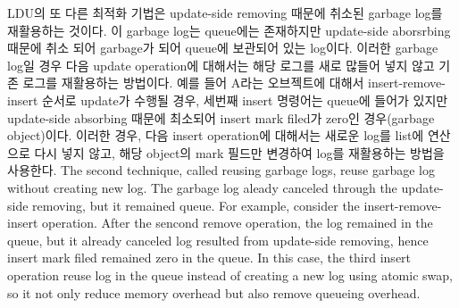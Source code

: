 
\ifkor
LDU의 또 다른 최적화 기법은 update-side removing 때문에 취소된 garbage log를 재활용하는 것이다.
이 garbage log는 queue에는 존재하지만 update-side aborsrbing 때문에 취소 되어 garbage가 되어 queue에
보관되어 있는 log이다. 
이러한 garbage log일 경우 다음 update operation에 대해서는 해당 로그를 새로 많들어 넣지 않고 기존 로그를 재활용하는
방법이다.
예를 들어 A라는 오브젝트에 대해서 insert-remove-insert 순서로 update가 수행될 경우, 세번째 insert 명령어는
queue에 들어가 있지만 update-side absorbing 때문에 최소되어 insert mark filed가 zero인
경우(garbage object)이다.
이러한 경우, 다음 insert operation에 대해서는 새로운 log를 list에 연산으로 다시 넣지 않고, 해당 object의 mark
필드만 변경하여 log를 재활용하는 방법을 사용한다.
\else
The second technique, called reusing garbage logs, reuse garbage log without
creating new log.
The garbage log aleady canceled through the update-side removing, but it
remained queue.
For example, consider the insert-remove-insert operation.
After the sencond remove operation, the log remained in the queue, but it
already canceled log resulted from update-side removing, hence insert mark filed
remained zero in the queue.
In this case, the third insert operation reuse log in the queue instead of 
creating a new log using atomic swap, so it not only reduce memory overhead but
also remove queueing overhead.
\fi


